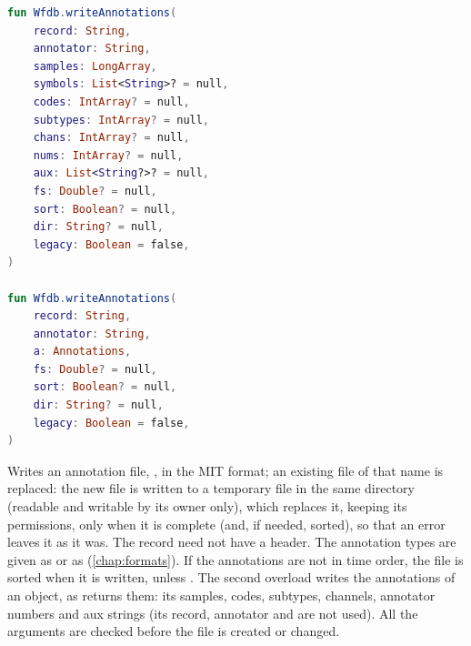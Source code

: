 \begin{lstlisting}[language=Kotlin,style=signature]
fun Wfdb.writeAnnotations(
    record: String,
    annotator: String,
    samples: LongArray,
    symbols: List<String>? = null,
    codes: IntArray? = null,
    subtypes: IntArray? = null,
    chans: IntArray? = null,
    nums: IntArray? = null,
    aux: List<String?>? = null,
    fs: Double? = null,
    sort: Boolean? = null,
    dir: String? = null,
    legacy: Boolean = false,
)

fun Wfdb.writeAnnotations(
    record: String,
    annotator: String,
    a: Annotations,
    fs: Double? = null,
    sort: Boolean? = null,
    dir: String? = null,
    legacy: Boolean = false,
)
\end{lstlisting}
Writes an annotation file, , in the MIT format; an existing file of
that name is replaced: the new file is written to a temporary file in the same directory
(readable and writable by its owner only), which replaces it, keeping its permissions,
only when it is complete (and, if needed, sorted), so that an error leaves it as it
was. The record need not have a header. The annotation types are
given as  or as  (\cref{chap:formats}). If the annotations are
not in time order, the file is sorted when it is written, unless . The
second overload writes the annotations of an  object, as
 returns them: its samples, codes, subtypes, channels, annotator
numbers and aux strings (its record, annotator and  are not used). All the
arguments are checked before the file is created or changed.
